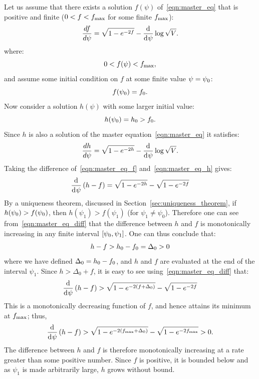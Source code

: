 Let us assume that there exists a solution \(f(\psi)\) of~\eqref{eqn:master_eq} that is positive and finite (\(0<f<f_\mathrm{max}\) for some finite \(f_\mathrm{max}\)):
%
\begin{equation}
  \frac{d f}{d \psi} = \sqrt{1-e^{-2f}} -\frac{\operatorname{d}^{}\!{}}{\operatorname{d}^{}\!{\psi}}\log \sqrt V.
  \label{eqn:master_eq_f}
\end{equation}
%
where:
%
\begin{equation}
  0<f(\psi)<f_\mathrm{max},
\end{equation}
%
and assume some initial condition on \(f\) at some finite value
\(\psi=\psi_0\):
%
\begin{equation}
  f(\psi_0)=f_0.
\end{equation}
%
Now consider a solution \(h(\psi)\) with some larger initial value:
%
\begin{equation}
  h(\psi_0)=h_0>f_0.
\end{equation}
%
Since \(h\) is also a solution of the master equation~\eqref{eqn:master_eq} it satisfies:
%
\begin{equation}
  \frac{d h}{d \psi} = \sqrt{1-e^{-2h}} -\frac{\operatorname{d}^{}\!{}}{\operatorname{d}^{}\!{\psi}}\log \sqrt V.
  \label{eqn:master_eq_h}
\end{equation}
%
Taking the difference of~\eqref{eqn:master_eq_f} and~\eqref{eqn:master_eq_h} gives:
%
\begin{equation}
  \frac{\operatorname{d}^{}\!{}}{\operatorname{d}^{}\!{\psi}}\left(h-f\right)
  = 
  \sqrt{1-e^{-2h}}-\sqrt{1-e^{-2f}}
  \label{eqn:master_eq_diff}
\end{equation}
%
By a uniqueness theorem, discussed in Section~\ref{sec:uniqueness_theorem}, if \(h(\psi_0)>f(\psi_0)\), then \(h(\psi_1)>f(\psi_1)\) (for \(\psi_1\ne\psi_0\)). Therefore one can see from~\eqref{eqn:master_eq_diff} that the difference between \(h\) and \(f\) is monotonically increasing in any finite interval \([\psi_0,\psi_1]\).  One can thus conclude that:
%
\begin{equation}
  h-f>h_0-f_0=\Delta_0>0
  \label{eqn:cosh_rel}
\end{equation}
%
where we have defined \(\Delta_0 = h_0-f_0\), and \(h\) and \(f\) are evaluated at the end of the interval \(\psi_1\). Since \(h>\Delta_0+f\), it is easy to see using~\eqref{eqn:master_eq_diff} that:
%
\begin{equation}
  \frac{\operatorname{d}^{}\!{}}{\operatorname{d}^{}\!{\psi}}\left(h-f\right)
  > 
  \sqrt{1-e^{-2(f+\Delta_0)}}-\sqrt{1-e^{-2f}}
\end{equation}
%
This is a monotonically decreasing function of \(f\), and hence attains its minimum at \(f_\mathrm{max}\); thus,
%
\begin{equation}
  \frac{\operatorname{d}^{}\!{}}{\operatorname{d}^{}\!{\psi}}\left(h-f\right)
  > 
  \sqrt{1-e^{-2(f_\mathrm{max}+\Delta_0)}}-\sqrt{1-e^{-2f_\mathrm{max}}} 
  >
  0.
\end{equation}
%
The difference between \(h\) and \(f\) is therefore monotonically increasing at a rate greater than some positive number. Since \(f\) is positive, it is bounded below and as \(\psi_1\) is made arbitrarily large, \(h\) grows without bound.

